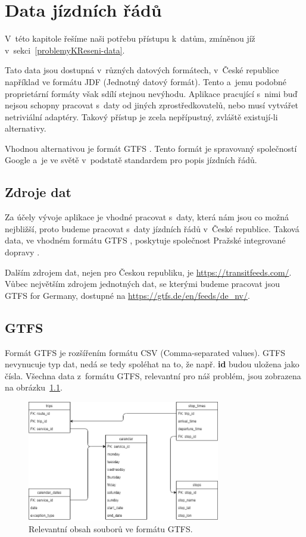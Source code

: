 \chapter{Data jízdních řádů}\label{kapitola-1}

V~této kapitole řešíme naši potřebu přístupu k~datům, zmíněnou jíž v~sekci~\ref{problemyKReseni-data}.

Tato data jsou dostupná v~různých datových formátech, v~České republice například ve formátu JDF (Jednotný datový formát). Tento a~jemu podobné proprietární formáty však sdílí stejnou nevýhodu. Aplikace pracující s~nimi buď nejsou schopny pracovat s~daty od jiných zprostředkovatelů, nebo musí vytvářet netriviální adaptéry. Takový přístup je zcela nepřípustný, zvláště existují-li alternativy.

Vhodnou alternativou je formát GTFS \citep{gtfs}. Tento formát je spravovaný společností Google a~je ve světě v~podstatě standardem pro popis jízdních řádů.

\section{Zdroje dat}

Za účely vývoje aplikace je vhodné pracovat s~daty, která nám jsou co možná nejbližší, proto budeme pracovat s~daty jízdních řádů v~České republice. Taková data, ve vhodném formátu GTFS \citep{gtfs}, poskytuje společnost Pražské integrované dopravy \citet{pidData}.

Dalším zdrojem dat, nejen pro Českou republiku, je \url{https://transitfeeds.com/}. Vůbec největším zdrojem jednotných dat, se kterými budeme pracovat jsou GTFS for Germany, dostupné na \url{https://gtfs.de/en/feeds/de\_nv/}.

\section{GTFS}\label{gtfs-popis}

Formát GTFS je rozšířením formátu CSV (Comma-separated values). GTFS nevynucuje typ dat, nedá se tedy spoléhat na to, že např. \textbf{id} budou uložena jako čísla. Všechna data z~formátu GTFS, relevantní pro náš problém, jsou zobrazena na obrázku~\ref{fig:gtfs-data}.

\begin{figure}[ht]
    \centering
    \includegraphics[width=0.75\textwidth]{../img/gtfs-data}
    \caption{Relevantní obsah souborů ve formátu GTFS.}
    \label{fig:gtfs-data}
\end{figure}

